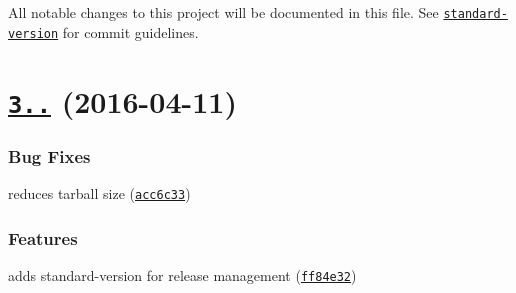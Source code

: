 All notable changes to this project will be documented in this file. See \href{https://github.com/conventional-changelog/standard-version}{\tt standard-\/version} for commit guidelines.

\label{_3.2.0}%
 \section*{\href{https://github.com/yargs/cliui/compare/v3.1.2...v3.2.0}{\tt 3..} (2016-\/04-\/11)}

\subsubsection*{Bug Fixes}


\begin{DoxyItemize}
\item reduces tarball size (\href{https://github.com/yargs/cliui/commit/acc6c33}{\tt acc6c33})
\end{DoxyItemize}

\subsubsection*{Features}


\begin{DoxyItemize}
\item adds standard-\/version for release management (\href{https://github.com/yargs/cliui/commit/ff84e32}{\tt ff84e32}) 
\end{DoxyItemize}